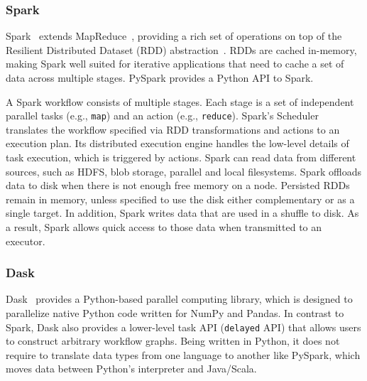 
\subsubsection*{Spark}

Spark~\cite{zaharia2010spark} extends MapReduce~\cite{dean2004mapreduce},
providing a rich set of operations on top of the Resilient Distributed Dataset
(RDD) abstraction~\cite{zaharia2012resilient}. RDDs are cached in-memory, making
Spark well suited for iterative applications that need to cache a set of data
across multiple stages. PySpark provides a Python API to Spark.

A Spark workflow consists of multiple stages. Each stage is a set of independent
parallel tasks (e.g., \texttt{map}) and an action (e.g., \texttt{reduce}).
Spark's Scheduler translates the workflow specified via RDD transformations and
actions to an execution plan. Its distributed execution engine handles the
low-level details of task execution, which is triggered by actions. Spark can
read data from different sources, such as HDFS, blob storage, parallel and local
filesystems. Spark offloads data to disk when there is not enough free memory 
on a node. Persisted RDDs remain in memory,
unless specified to use the disk either complementary or as a single target. In
addition, Spark writes data that are used in a shuffle to disk. As a result, Spark
allows quick access to those data when transmitted to an executor.

\subsubsection*{Dask}

Dask~\cite{rocklin2015dask} provides a Python-based parallel computing library,
which is designed to parallelize native Python code written for NumPy and
Pandas. In contrast to Spark, Dask also provides a lower-level task API
(\texttt{delayed} API) that allows users to construct arbitrary workflow graphs.
Being written in Python, it does not require to translate data types from one
language to another like PySpark, which moves data between Python's interpreter
and Java/Scala.


